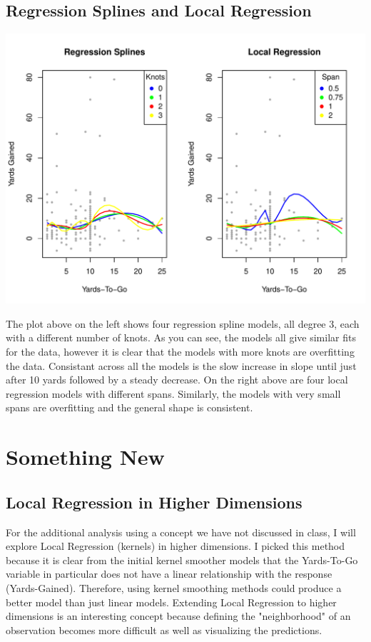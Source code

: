 \documentclass{article}
\begin{document}
\subsection*{Regression Splines and Local Regression}

\includegraphics{project4-012}

The plot above on the left shows four regression spline models, all degree 3, each with a different number of knots. As you can see, the models all give similar fits for the data, however it is clear that the models with more knots are overfitting the data. Consistant across all the models is the slow increase in slope until just after 10 yards followed by a steady decrease. On the right above are four local regression models with different spans. Similarly, the models with very small spans are overfitting and the general shape is consistent. 

\section*{Something New}

\subsection*{Local Regression in Higher Dimensions}

For the additional analysis using a concept we have not discussed in class, I will explore Local Regression (kernels) in higher dimensions. I picked this method because it is clear from the initial kernel smoother models that the Yards-To-Go variable in particular does not have a linear relationship with the response (Yards-Gained). Therefore, using kernel smoothing methods could produce a better model than just linear models. Extending Local Regression to higher dimensions is an interesting concept because defining the "neighborhood" of an observation becomes more difficult as well as visualizing the predictions. 
\end{document}
